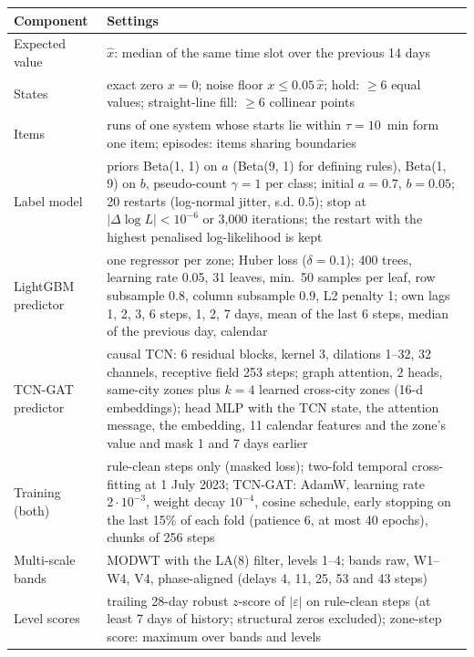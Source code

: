 \documentclass[11pt,a4paper]{article}
\makeatletter
\newenvironment{stable}{\par\addvspace{8pt}\noindent\begin{minipage}{\textwidth}\def\@captype{table}\centering}{\end{minipage}\par\addvspace{8pt}}
\makeatother
\begin{document}
\begin{stable}
\caption{Settings used for every result of the article (the full list of parameters is in the released code). GDN and USAD use the settings released by their authors.}\label{tab:s-settings}
\footnotesize\setlength{\tabcolsep}{4pt}
\begin{tabular}{@{}>{\raggedright\arraybackslash}p{3.3cm} >{\raggedright\arraybackslash}p{12.2cm}@{}}
\toprule
Component & Settings \\
\midrule
Expected value & $\hat{x}$: median of the same time slot over the previous 14 days \\
States & exact zero $x = 0$; noise floor $x \leq 0.05\,\hat{x}$; hold: $\geq 6$ equal values; straight-line fill: $\geq 6$ collinear points \\
Items & runs of one system whose starts lie within $\tau = 10$~min form one item; episodes: items sharing boundaries \\
Label model & priors Beta(1, 1) on $a$ (Beta(9, 1) for defining rules), Beta(1, 9) on $b$, pseudo-count $\gamma = 1$ per class; initial $a = 0.7$, $b = 0.05$; 20 restarts (log-normal jitter, s.d. 0.5); stop at $|\Delta \log L| < 10^{-6}$ or 3,000 iterations; the restart with the highest penalised log-likelihood is kept \\
LightGBM predictor & one regressor per zone; Huber loss ($\delta = 0.1$); 400 trees, learning rate 0.05, 31 leaves, min.\ 50 samples per leaf, row subsample 0.8, column subsample 0.9, L2 penalty 1; own lags 1, 2, 3, 6 steps, 1, 2, 7 days, mean of the last 6 steps, median of the previous day, calendar \\
TCN-GAT predictor & causal TCN: 6 residual blocks, kernel 3, dilations 1--32, 32 channels, receptive field 253 steps; graph attention, 2 heads, same-city zones plus $k = 4$ learned cross-city zones (16-d embeddings); head MLP with the TCN state, the attention message, the embedding, 11 calendar features and the zone's value and mask 1 and 7 days earlier \\
Training (both) & rule-clean steps only (masked loss); two-fold temporal cross-fitting at 1 July 2023; TCN-GAT: AdamW, learning rate $2 \cdot 10^{-3}$, weight decay $10^{-4}$, cosine schedule, early stopping on the last 15\% of each fold (patience 6, at most 40 epochs), chunks of 256 steps \\
Multi-scale bands & MODWT with the LA(8) filter, levels 1--4; bands raw, W1--W4, V4, phase-aligned (delays 4, 11, 25, 53 and 43 steps) \\
Level scores & trailing 28-day robust $z$-score of $|\varepsilon|$ on rule-clean steps (at least 7 days of history; structural zeros excluded); zone-step score: maximum over bands and levels \\

\end{tabular}
\end{stable}
\end{document}
